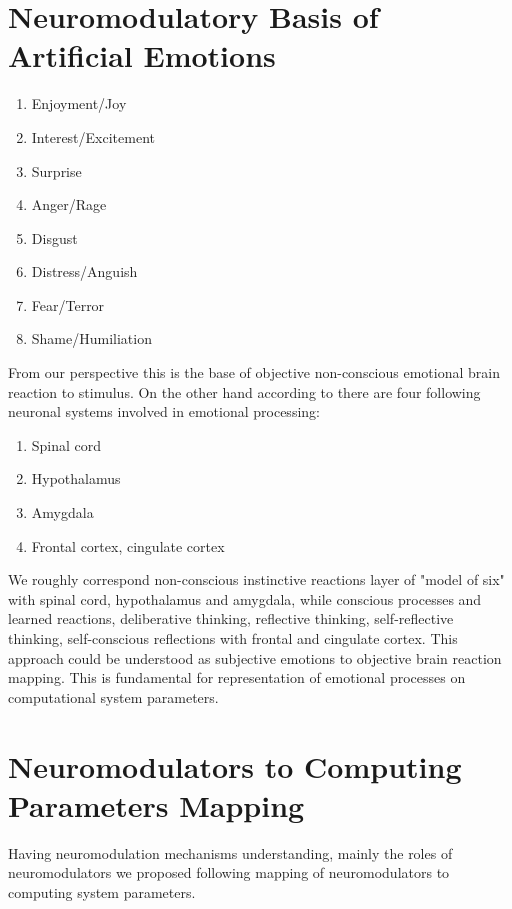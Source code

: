 \section{Neuromodulatory Basis of Artificial Emotions}

\begin{enumerate}
 \item  Enjoyment/Joy
 \item  Interest/Excitement
 \item  Surprise
 \item  Anger/Rage
 \item  Disgust
 \item  Distress/Anguish
 \item  Fear/Terror
 \item  Shame/Humiliation
\end{enumerate}

From our perspective this is the base of objective non-conscious emotional brain reaction to stimulus. On the other hand according to \cite{emotionsbraintorobot} there are four following neuronal systems involved in emotional processing:

\begin{enumerate}
 \item  Spinal cord
 \item  Hypothalamus
 \item  Amygdala
 \item  Frontal cortex, cingulate cortex
\end{enumerate}

We roughly correspond non-conscious instinctive reactions layer of "model of six" \cite{emotionmachine} with spinal cord, hypothalamus and amygdala, while conscious processes and learned reactions, deliberative thinking, reflective thinking, self-reflective thinking, self-conscious reflections with frontal and cingulate cortex. This approach could be understood as subjective emotions to objective brain reaction mapping. This is fundamental for representation of emotional processes on computational system parameters.

\section{Neuromodulators to Computing Parameters Mapping}

Having neuromodulation mechanisms understanding, mainly the roles of neuromodulators \cite{cubeofemotions, emotionsbraintorobot} we proposed following mapping of neuromodulators to computing system parameters.

